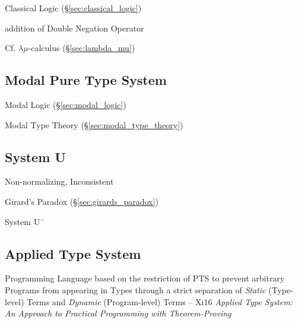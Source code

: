 Classical Logic (\S\ref{sec:classical_logic})

addition of Double Negation Operator

\fist Cf. $\lambda\mu$-calculus (\S\ref{sec:lambda_mu})



\subsection{Modal Pure Type System}\label{sec:mpts}

Modal Logic (\S\ref{sec:modal_logic})

Modal Type Theory (\S\ref{sec:modal_type_theory})



\subsection{System U}\label{sec:system_u}

Non-normalizing, Inconsistent

Girard's Paradox (\S\ref{sec:girards_paradox})

System U$^-$



\subsection{Applied Type System}\label{sec:ats}

\begingroup

\newcommand{\lam}{\mathsf{lam}}
\newcommand{\app}{\mathsf{app}}
\newcommand{\slam}{\mathsf{slam}}
\newcommand{\sapp}{\mathsf{sapp}}
\renewcommand{\lett}{\mathsf{let}}
\renewcommand{\inn}{\mathsf{in}}
\newcommand{\INT}{\mathsf{int}}
\newcommand{\BOOL}{\mathsf{bool}}
\newcommand{\Int}{\mathsf{Int}}
\newcommand{\Bool}{\mathsf{Bool}}
\renewcommand{\Nat}{\mathsf{Nat}}
\newcommand{\dtree}{\mathscr{D}}

Programming Language based on the restriction of PTS to prevent
arbitrary Programs from appearing in Types through a strict separation
of \emph{Static} (Type-level) Terms and \emph{Dynamic} (Program-level)
Terms -- Xi16 \emph{Applied Type System: An Approach to Practical
  Programming with Theorem-Proving}

